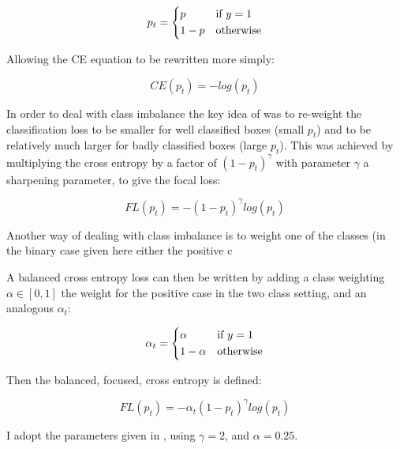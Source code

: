 \begin{equation}
p_t = 
  \begin{cases*}
  p & if $y = 1$\\
  1 - p & otherwise\\
  \end{cases*}
\label{eq:class_prob}
\end{equation}

Allowing the \gls{CE} equation to be rewritten more simply:

\begin{equation}
CE(p_t) = -log(p_t)
\label{eq:short_cross_entropy}
\end{equation}


In order to deal with class imbalance the key idea of \cite{Lin2017} was to re-weight the classification loss to be smaller for well classified boxes (small $p_t$) and to be relatively much larger for badly classified boxes (large $p_t$). This was achieved by multiplying the cross entropy by a factor of $(1 - p_t)^\gamma $ with parameter $\gamma$ a sharpening parameter, to give the focal loss:

\begin{equation}
FL(p_t) = - (1 - p_t)^\gamma log(p_t)
\label{eq:focal_loss_p}
\end{equation}

Another way of dealing with class imbalance is to weight one of the classes (in the binary case given here either the positive c

A balanced cross entropy loss can then be written by adding a class weighting $\alpha \in \left[0, 1\right]$ the weight for the positive case in the two class setting, and an analogous $\alpha_t$:

\begin{equation}
\alpha_t = 
  \begin{cases*}
  \alpha & if $y = 1$\\
  1 - \alpha & otherwise\\
  \end{cases*}
\label{eq:balanced_weight}
\end{equation}

Then the balanced, focused, cross entropy is defined:

\begin{equation}
FL(p_t) = -\alpha_t (1 - p_t)^\gamma log(p_t)
\label{eq:focal_loss}
\end{equation}


I adopt the parameters given in \cite{Lin2017}, using $ \gamma = 2 $, and $ \alpha = 0.25 $.

